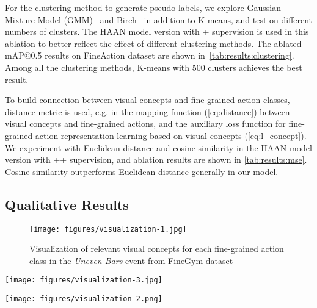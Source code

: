 For the clustering method to generate pseudo labels, we explore Gaussian Mixture Model (GMM)~\cite{reynolds2009gaussian} and Birch~\cite{zhang1996birch} in addition to K-means, and test on different numbers of clusters. 
The HAAN model version with + supervision is used in this ablation to better reflect the effect of different clustering methods. The ablated mAP@0.5 results on FineAction dataset are shown in~\cref{tab:results:clustering}. Among all the clustering methods, K-means with 500 clusters achieves the best result.




To build connection between visual concepts and fine-grained action classes, distance metric is used, e.g. in the mapping function  (\cref{eq:distance}) between visual concepts and fine-grained actions, and the auxiliary loss function for fine-grained action representation learning based on visual concepts (\cref{eq:l_concept}). We experiment with Euclidean distance and cosine similarity in the HAAN model version with ++ supervision, and ablation results are shown in \cref{tab:results:mse}. Cosine similarity outperforms Euclidean distance generally in our model.






\subsection{Qualitative Results}




\begin{figure}[t]
  \centering
   \texttt{[image: figures/visualization-1.jpg]}
   \caption{Visualization of relevant visual concepts for each fine-grained action class in the \textit{Uneven Bars} event from FineGym dataset}
   \label{fig:concepts-actions}
\end{figure}

\begin{figure*}[t]
  \centering
   \texttt{[image: figures/visualization-3.jpg]}
   \caption{Three example visual concepts learned in our model representing atomic actions}
   \label{fig:concepts-example}
\end{figure*}


\begin{figure*}[t]
  \centering
   \texttt{[image: figures/visualization-2.png]}
   \caption{Two example action detections from our HAAN model. Visual concepts A and B correspond to those visualized in \cref{fig:concepts-example}}
   \label{fig:detection}
\end{figure*}


